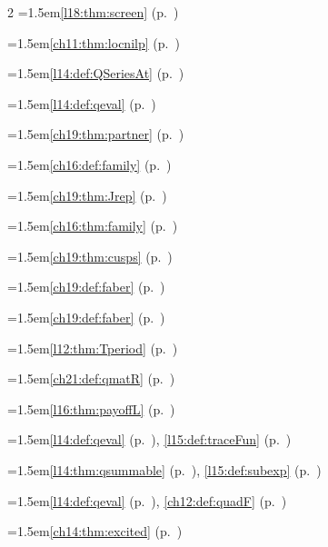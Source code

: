 \begin{multicols}{2}
\hangindent=1.5em\quad \ref{l18:thm:screen} (p.~\pageref{l18:thm:screen})\par
\hangindent=1.5em\quad \ref{ch11:thm:locnilp} (p.~\pageref{ch11:thm:locnilp})\par
\hangindent=1.5em\quad \ref{l14:def:QSeriesAt} (p.~\pageref{l14:def:QSeriesAt})\par
\hangindent=1.5em\quad \ref{l14:def:qeval} (p.~\pageref{l14:def:qeval})\par
\hangindent=1.5em\quad \ref{ch19:thm:partner} (p.~\pageref{ch19:thm:partner})\par
\hangindent=1.5em\quad \ref{ch16:def:family} (p.~\pageref{ch16:def:family})\par
\hangindent=1.5em\quad \ref{ch19:thm:Jrep} (p.~\pageref{ch19:thm:Jrep})\par
\hangindent=1.5em\quad \ref{ch16:thm:family} (p.~\pageref{ch16:thm:family})\par
\hangindent=1.5em\quad \ref{ch19:thm:cusps} (p.~\pageref{ch19:thm:cusps})\par
\hangindent=1.5em\quad \ref{ch19:def:faber} (p.~\pageref{ch19:def:faber})\par
\hangindent=1.5em\quad \ref{ch19:def:faber} (p.~\pageref{ch19:def:faber})\par
\hangindent=1.5em\quad \ref{l12:thm:Tperiod} (p.~\pageref{l12:thm:Tperiod})\par
\hangindent=1.5em\quad \ref{ch21:def:qmatR} (p.~\pageref{ch21:def:qmatR})\par
\hangindent=1.5em\quad \ref{l16:thm:payoffL} (p.~\pageref{l16:thm:payoffL})\par
\hangindent=1.5em\quad \ref{l14:def:qeval} (p.~\pageref{l14:def:qeval}), \ref{l15:def:traceFun} (p.~\pageref{l15:def:traceFun})\par
\hangindent=1.5em\quad \ref{l14:thm:qsummable} (p.~\pageref{l14:thm:qsummable}), \ref{l15:def:subexp} (p.~\pageref{l15:def:subexp})\par
\hangindent=1.5em\quad \ref{l14:def:qeval} (p.~\pageref{l14:def:qeval}), \ref{ch12:def:quadF} (p.~\pageref{ch12:def:quadF})\par
\hangindent=1.5em\quad \ref{ch14:thm:excited} (p.~\pageref{ch14:thm:excited})\par

\end{multicols}

